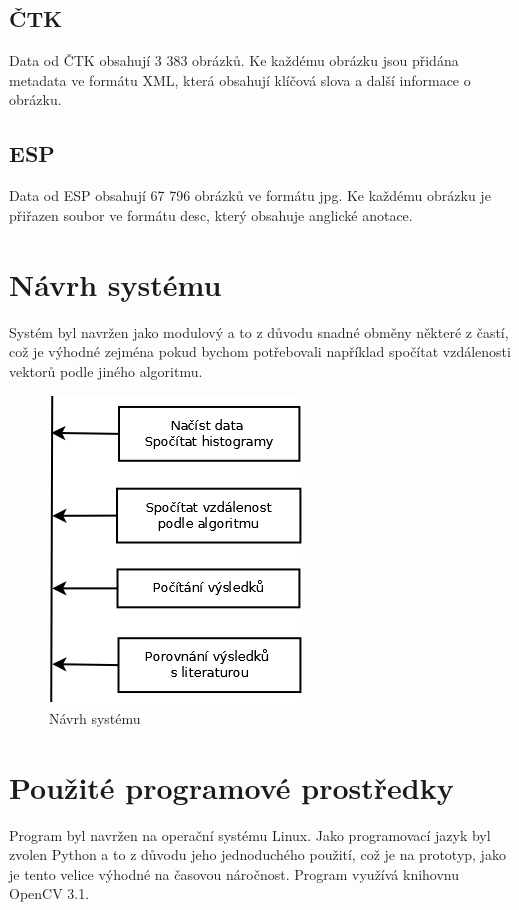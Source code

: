 \documentclass[czech,BP]{thesiskiv}
\begin{document}
\section{ČTK}
Data od ČTK obsahují 3 383 obrázků. Ke každému obrázku jsou přidána metadata ve formátu XML, která obsahují klíčová slova a další informace o obrázku. 

\section{ESP}
Data od ESP obsahují 67 796 obrázků ve formátu jpg. Ke každému obrázku je přiřazen soubor ve formátu desc, který obsahuje anglické anotace.





\chapter{Návrh systému}
Systém byl navržen jako modulový a to z důvodu snadné obměny některé z častí, což je výhodné zejména pokud bychom potřebovali například spočítat vzdálenosti vektorů podle jiného algoritmu. 

\begin{figure}[h]
		\centering
		\includegraphics[width=253px]{./img/graf.png}	
		\caption{Návrh systému}
\end{figure}


\chapter{Použité programové prostředky}
Program byl navržen na operační systému Linux. Jako programovací jazyk byl zvolen Python a to z důvodu jeho jednoduchého použití, což je na prototyp, jako je tento velice výhodné na časovou náročnost. Program využívá knihovnu OpenCV 3.1. 
  
\end{document}
